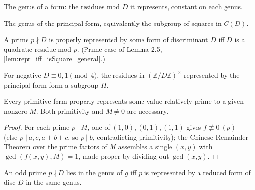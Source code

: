 \begin{definition}[Genus]
  \label{def:genus}
  \leanok
  The genus of a form: the residues mod $D$ it represents, constant on each genus.
\end{definition}

\begin{definition}
  \label{def:principal_genus}
  \leanok
  The genus of the principal form, equivalently the subgroup of squares in $C(D)$.
\end{definition}

\begin{theorem}
  \label{thm:representation_residue}
  \leanok
  A prime $p \nmid D$ is properly represented by some form of discriminant $D$ iff
  $D$ is a quadratic residue mod $p$. (Prime case of Lemma 2.5,
  \ref{lem:repr_iff_isSquare_general}.)
\end{theorem}

\begin{theorem}
  \label{lem:l2_24}
  \leanok
  For negative $D \equiv 0,1 \pmod 4$, the residues in
  $(\mathbb Z/D\mathbb Z)^\times$ represented by the principal form form a
  subgroup $H$.
\end{theorem}

\begin{theorem}
  \label{lem:l2_25}
  \leanok
  Every primitive form properly represents some value relatively prime to a given
  nonzero $M$. Both primitivity and $M\neq 0$ are necessary.
\end{theorem}
\begin{proof}\leanok
For each prime $p\mid M$, one of $(1,0),(0,1),(1,1)$ gives $f\not\equiv 0\ (p)$ (else
$p\mid a,c,a{+}b{+}c$, so $p\mid b$, contradicting primitivity); the Chinese Remainder
Theorem over the prime factors of $M$ assembles a single $(x,y)$ with $\gcd(f(x,y),M)=1$,
made proper by dividing out $\gcd(x,y)$.
\end{proof}

\begin{theorem}
  \label{thm:t2_26}
  \leanok
  An odd prime $p \nmid D$ lies in the genus of $g$ iff $p$ is represented by a
  reduced form of disc $D$ in the same genus.
\end{theorem}

